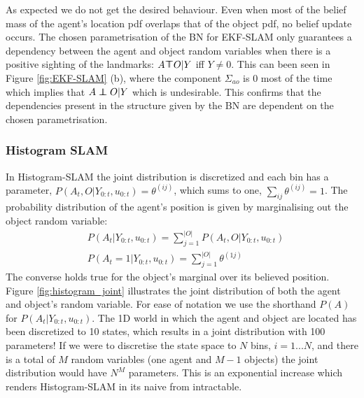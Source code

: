 As expected we do not get the desired behaviour. Even when most of the belief mass of the agent's 
location pdf overlaps that of the object pdf, no belief update occurs. The chosen parametrisation of the BN for EKF-SLAM only guarantees a 
dependency between the agent and object random variables when there is a positive sighting of the landmarks:
$A \dependent O | Y$ iff $Y \not= 0$.  This can been seen in Figure \ref{fig:EKF-SLAM} (b), where the component 
$\Sigma_{ao}$ is 0 most of the time which implies that $A \independent O | Y$ which is undesirable. 
This confirms that the dependencies present in the structure given by the BN are dependent on the chosen parametrisation.




\subsubsection{Histogram SLAM}\label{sec:Discrete}

In Histogram-SLAM the joint distribution is discretized and each bin has a parameter, 
$P(A_t,O|Y_{0:t},u_{0:t}) = \theta^{(ij)}$, which sums to one, $\sum_{ij} \theta^{(ij)} = 1$. 
The probability distribution of the agent's position is given by marginalising out the object random variable:
\begin{align}
 &P(A_t|Y_{0:t},u_{0:t})    = \sum\limits_{j=1}^{|O|} P(A_t,O|Y_{0:t},u_{0:t}) \label{eq:agent_marginal} \\
 &P(A_t=1|Y_{0:t},u_{0:t})  = \sum\limits_{j=1}^{|O|} \theta^{(1j)}
\end{align}
The converse holds true for the object's marginal over its believed position. Figure \ref{fig:histogram_joint} illustrates 
the joint distribution of both the agent and object's random variable. For ease of notation we use the shorthand $P(A)$
for $P(A_t|Y_{0:t},u_{0:t})$. The 1D world in which the agent and object are located has been discretized to 10 states,
which results in a joint distribution with 100 parameters!
If we were to discretise the state space to $N$ bins, $i=1...N$, and there is a total of $M$ random variables (one agent and $M-1$ objects)
the joint distribution would have $N^{M}$ parameters. This is an exponential increase which renders Histogram-SLAM in its naive from 
intractable.

